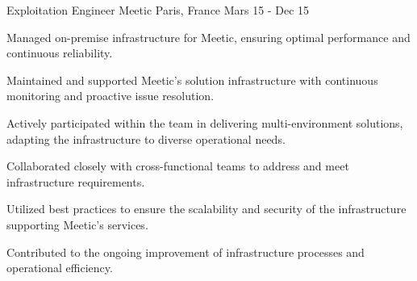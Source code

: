 \begin{cventries}
\cventry
{Exploitation Engineer} %
{Meetic} %
{Paris, France} %
{Mars 15 - Dec 15} %
{
  \begin{cvitems} %
    \item {Managed on-premise infrastructure for Meetic, ensuring optimal performance and continuous reliability.}
    \item {Maintained and supported Meetic's solution infrastructure with continuous monitoring and proactive issue resolution.}
    \item {Actively participated within the team in delivering multi-environment solutions, adapting the infrastructure to diverse operational needs.}
    \item {Collaborated closely with cross-functional teams to address and meet infrastructure requirements.}
    \item {Utilized best practices to ensure the scalability and security of the infrastructure supporting Meetic's services.}
    \item {Contributed to the ongoing improvement of infrastructure processes and operational efficiency.}
  \end{cvitems}
}

\end{cventries}
